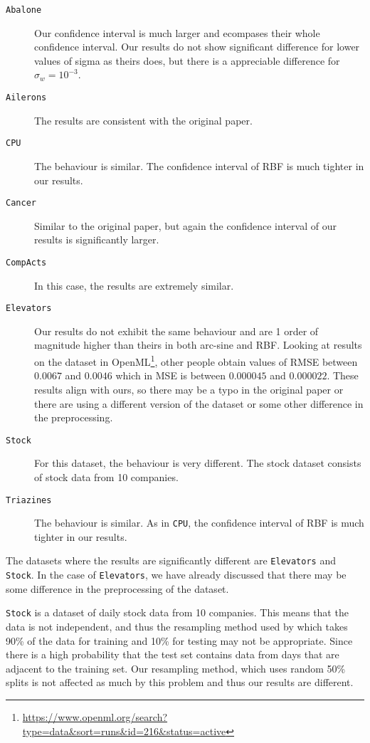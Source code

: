 \begin{description}
    \item[\texttt{Abalone}] Our confidence interval is much larger and ecompases
        their whole confidence interval. Our results do not show significant difference
        for lower values of sigma as theirs does, but there is a appreciable
        difference for $\sigma_w=10^{-3}$.
    \item[\texttt{Ailerons}] The results are consistent with the original paper.
    \item[\texttt{CPU}] The behaviour is similar. The confidence interval of RBF
        is much tighter in our results.
    \item[\texttt{Cancer}] Similar to the original paper, but again the confidence
        interval of our results is significantly larger.
    \item[\texttt{CompActs}] In this case, the results are extremely similar.
    \item[\texttt{Elevators}] Our results do not exhibit the same behaviour and
        are 1 order of magnitude higher than theirs in both arc-sine and RBF. Looking
        at results on the dataset in OpenML\footnote{\url{https://www.openml.org/search?type=data&sort=runs&id=216&status=active}}, other people obtain values of RMSE between $0.0067$ and $0.0046$ which
        in MSE is between $0.000045$ and $0.000022$. These results align with ours,
        so there may be a typo in the original paper or there are using a different
        version of the dataset or some other difference in the preprocessing.
    \item[\texttt{Stock}] For this dataset, the behaviour is very different. The
        stock dataset consists of stock data from 10 companies.
    \item[\texttt{Triazines}] The behaviour is similar. As in \texttt{CPU},
        the confidence interval of RBF is much tighter in our results.
\end{description}

The datasets where the results are significantly different are \texttt{Elevators}
and \texttt{Stock}. In the case of \texttt{Elevators}, we have already discussed
that there may be some difference in the preprocessing of the dataset.

\texttt{Stock} is a dataset of daily stock data from 10 companies. This
means that the data is not independent, and thus the resampling method used
by \textcite{frenayParameterinsensitiveKernelExtreme2011} which takes
90\% of the data for training and 10\% for testing may not be appropriate. Since
there is a high probability that the test set contains data from days that are
adjacent to the training set. Our resampling method, which uses random
50\% splits is not affected as much by this problem and thus our results are
different.

